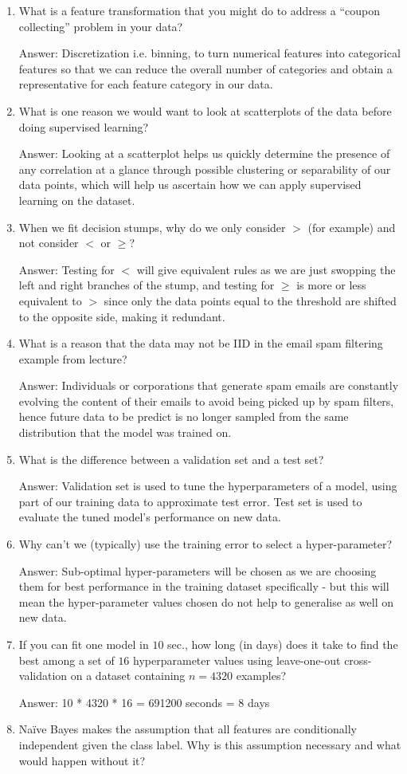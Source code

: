 \documentclass{article}
\def\ans#1{\par\gre{Answer: #1}}
\def\gre#1{{\color{gre}#1}}
\def\enum#1{\begin{enumerate}#1\end{enumerate}}
\begin{document}
\enum{
 \item What is a feature transformation that you might do to address a ``coupon collecting'' problem in your data?
 \ans {Discretization i.e. binning, to turn numerical features into categorical features so that we can reduce the overall number of categories and obtain a representative for each feature category in our data.}
\item What is one reason we would want to look at scatterplots of the data before doing supervised learning?
 \ans {Looking at a scatterplot helps us quickly determine the presence of any correlation at a glance through possible clustering or separability of our data points, which will help us ascertain how we can apply supervised learning on the dataset.}
 \item When we fit decision stumps, why do we only consider $>$ (for example) and not consider $<$ or $\geq$?
  \ans {Testing for $<$ will give equivalent rules as we are just swopping the left and right branches of the stump, and testing for $\geq$ is more or less equivalent to $>$ since only the data points equal to the threshold are shifted to the opposite side, making it redundant.}
\item What is a reason that the data may not be IID in the email spam filtering example from lecture?
 \ans {Individuals or corporations that generate spam emails are constantly evolving the content of their emails to avoid being picked up by spam filters, hence future data to be predict is no longer sampled from the same distribution that the model was trained on.}
\item What is the difference between a validation set and a test set?
 \ans {Validation set is used to tune the hyperparameters of a model, using part of our training data to approximate test error. Test set is used to evaluate the tuned model's performance on new data.}
\item Why can't we (typically) use the training error to select a hyper-parameter?
 \ans {Sub-optimal hyper-parameters will be chosen as we are choosing them for best performance in the training dataset specifically - but this will mean the hyper-parameter values chosen do not help to generalise as well on new data. }
\item If you can fit one model in $10$ sec., how long (in days) does it take to find the best among a set of $16$ hyperparameter values using leave-one-out cross-validation on a dataset containing $n=4320$ examples?
 \ans {10 * 4320 * 16 = 691200 seconds = 8 days}
\item{Na{\"i}ve Bayes makes the assumption that all features are conditionally independent given the class label. Why is this assumption necessary and what would happen without it?}
}
\end{document}
